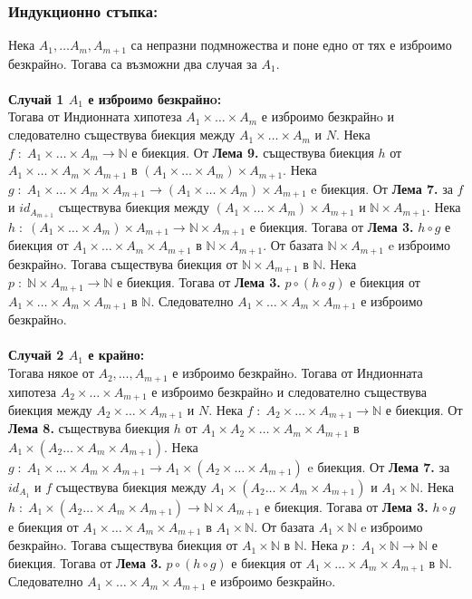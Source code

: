 \documentclass[a4paper, 12pt, oneside]{article}
\newcommand{\N}{\mathbb{N}}
\begin{document}
\subsubsection*{Индукционно стъпка:}
Нека \(A_1, \dots A_m, A_{m + 1}\) са непразни подмножества
и поне едно от тях е изброимо безкрайнo.
Тогава са възможни два случая за \(A_1\). \\
\hfill \\
\medskip
\textbf{Случай 1 \(A_1\) е изброимо безкрайнo:} \\
Тогава от Индионната хипотеза \(A_1 \times \dots \times A_m\)
е изброимо безкрайнo и следователно съществува биекция
между \(A_1 \times \dots \times A_m\) и \(N\).
Нека \(f \; : \; A_1 \times \dots \times A_m \to \N\) е биекция.
От \textbf{Лема 9.} съществува биекция \(h\)
от \(A_1 \times \dots \times A_m \times A_{m + 1}\)
в \((A_1 \times \dots \times A_m) \times A_{m + 1}\).
Нека \(g \; : \; A_1 \times \dots \times A_m \times A_{m + 1} \to (A_1 \times \dots \times A_m) \times A_{m + 1}\)
e биекция.
От \textbf{Лема 7.} за \(f\) и \(id_{A_{m + 1}}\) съществува биекция между
\((A_1 \times \dots \times A_m) \times A_{m + 1}\) и \(\N \times A_{m + 1}\).
Нека \(h \; : \; (A_1 \times \dots \times A_m) \times A_{m + 1} \to \N \times A_{m + 1}\) е биекция.
Тогава от \textbf{Лема 3.} \(h \circ g\) е биекция
от \(A_1 \times \dots \times A_m \times A_{m + 1}\) в \(\N \times A_{m + 1}\).
От базата \(\N \times A_{m + 1}\) e изброимо безкрайнo.
Тогава съществува биекция от \(\N \times A_{m + 1}\) в \(\N\).
Нека \(p \; : \; \N \times A_{m + 1} \to \N\) е биекция.
Тогава от \textbf{Лема 3.} \(p \circ (h \circ g)\) е биекция
от \(A_1 \times \dots \times A_m \times A_{m + 1}\) в \(\N\).
Следователно \(A_1 \times \dots \times A_m \times A_{m + 1}\) е изброимо безкрайнo. \\
\hfill \\
\medskip
\textbf{Случай 2 \(A_1\) е крайно:} \\
Тогава някое от \(A_2, \dots, A_{m + 1}\) е изброимо безкрайнo.
Тогава от Индионната хипотеза \(A_2 \times \dots \times A_{m + 1}\)
е изброимо безкрайнo и следователно съществува биекция
между \(A_2 \times \dots \times A_{m + 1}\) и \(N\).
Нека \(f \; : \; A_2 \times \dots \times A_{m + 1} \to \N\) е биекция.
От \textbf{Лема 8.} съществува биекция \(h\)
от \(A_1 \times A_2 \times \dots \times A_m \times A_{m + 1}\)
в \(A_1 \times (A_2 \dots \times A_m \times A_{m + 1})\).
Нека \(g \; : \; A_1 \times \dots \times A_m \times A_{m + 1} \to A_1 \times (A_2 \times \dots \times A_{m + 1})\)
e биекция.
От \textbf{Лема 7.} за \(id_{A_1}\) и \(f\) съществува биекция между
\(A_1 \times (A_2 \dots \times A_m \times A_{m + 1})\) и \(A_1 \times \N\).
Нека \(h \; : \; A_1 \times (A_2 \dots \times A_m \times A_{m + 1}) \to \N \times A_{m + 1}\) е биекция.
Тогава от \textbf{Лема 3.} \(h \circ g\) е биекция
от \(A_1 \times \dots \times A_m \times A_{m + 1}\) в \(A_1 \times \N\).
От базата \(A_1 \times \N\) e изброимо безкрайнo.
Тогава съществува биекция от \(A_1 \times \N\) в \(\N\).
Нека \(p \; : \; A_1 \times \N \to \N\) е биекция.
Тогава от \textbf{Лема 3.} \(p \circ (h \circ g)\) е биекция
от \(A_1 \times \dots \times A_m \times A_{m + 1}\) в \(\N\).
Следователно \(A_1 \times \dots \times A_m \times A_{m + 1}\) е изброимо безкрайнo.
\end{document}
